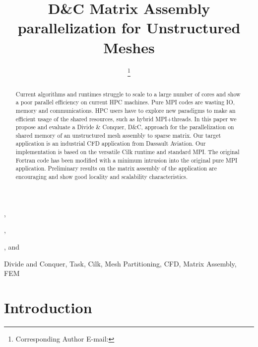 \documentclass{IOS-Book-Article}
\begin{document}
\begin{frontmatter}              %

\title{D\&C Matrix Assembly parallelization for Unstructured Meshes}

\author[A]{ %
\thanks{Corresponding Author E-mail: }},
\author[A]{ },
\author[A]{ },
and
\author[B]{ }

\address[A]{PRISM - University of Versailles, France}
\address[B]{Dassault Aviation, Saint-Cloud, France}

\begin{abstract}
Current algorithms and runtimes struggle to scale to a large number of cores and show a poor parallel efficiency on current HPC machines.
Pure MPI codes are wasting IO, memory and communications. HPC users have to explore new paradigms to make an efficient usage of the shared resources,
such as hybrid MPI+threads.
In this paper we propose and evaluate a Divide \& Conquer, D\&C, approach for the parallelization on shared memory of an unstructured mesh assembly to sparse matrix.
Our target application is an industrial CFD application from Dassault Aviation.
Our implementation is based on the versatile Cilk runtime and standard MPI.
The original Fortran code has been modified with a minimum intrusion into the original pure MPI application.
Preliminary results on the matrix assembly of the application are encouraging and show good locality and scalability characteristics.
\end{abstract}

\begin{keyword}
Divide and Conquer, Task, Cilk, Mesh Partitioning, CFD, Matrix Assembly, FEM
\end{keyword}
\end{frontmatter}

\thispagestyle{empty}
\pagestyle{empty}

\section{Introduction}
\end{document}
